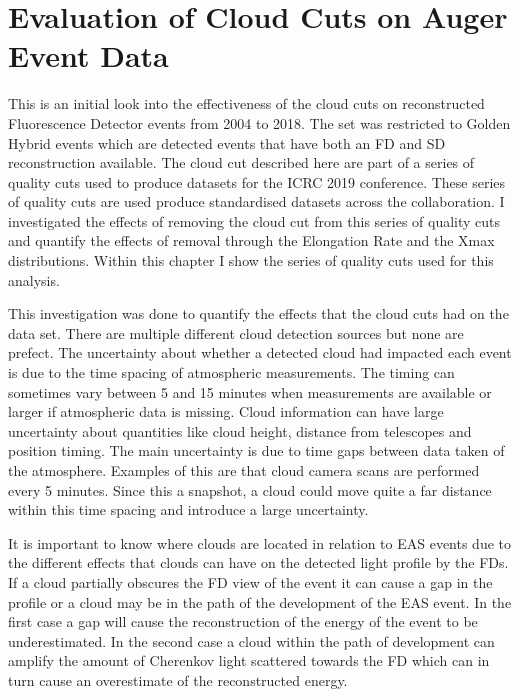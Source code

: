 \chapter[Evaluation of Cloud Cuts on Auger Event Data]{\centering Evaluation of Cloud Cuts on Auger Event Data \\}\label{Ch:CloudCuts}

This is an initial look into the effectiveness of the cloud cuts on reconstructed Fluorescence Detector events from 2004 to 2018. The set was restricted to Golden Hybrid events which are detected events that have both an FD and SD reconstruction available. The cloud cut described here are part of a series of quality cuts used to produce datasets for the ICRC 2019 conference. These series of quality cuts are used produce standardised datasets across the collaboration. I investigated the effects of removing the cloud cut from this series of quality cuts and quantify the effects of removal through the Elongation Rate and the Xmax distributions. Within this chapter I show the series of quality cuts used for this analysis.


This investigation was done to quantify the effects that the cloud cuts had on the data set. There are multiple different cloud detection sources but none are prefect. The uncertainty about whether a detected cloud had impacted each event is due to the time spacing of atmospheric measurements. The timing can sometimes vary between 5 and 15 minutes when measurements are available or larger if  atmospheric data is missing. Cloud information can have large uncertainty about quantities like cloud height, distance from telescopes and position timing. The main uncertainty is due to time gaps between data taken of the atmosphere. Examples of this are that cloud camera scans are performed every 5 minutes. Since this a snapshot, a cloud could move quite a far distance within this time spacing and introduce a large uncertainty.  

It is important to know where clouds are located in relation to EAS events due to the different effects that clouds can have on the detected light profile by the FDs. If a cloud partially obscures the FD view of the event it can cause a gap in the profile or a cloud may be in the path of the development of the EAS event. In the first case a gap will cause the reconstruction of the energy of the event to be underestimated. In the second case a cloud within the path of development can amplify the amount of Cherenkov light scattered towards the FD which can in turn cause an overestimate of the reconstructed energy.


